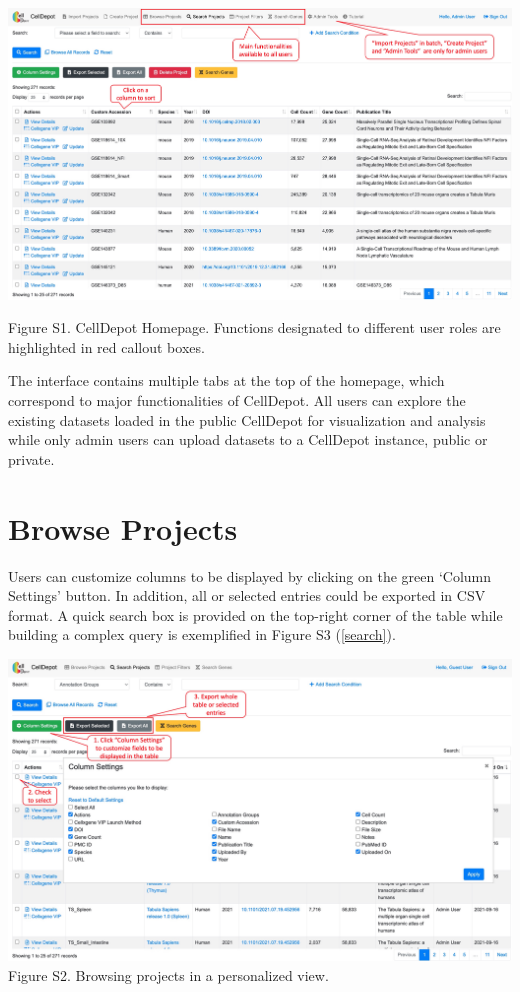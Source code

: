 \documentclass[
  openany]{book}
\begin{document}
\href{https://interactivereport.github.io/CellDepot/bookdown/figures/S1.jpg}{\includegraphics{figures/S1.jpg}}

Figure S1. CellDepot Homepage. Functions designated to different user roles are highlighted in red callout boxes.

The interface contains multiple tabs at the top of the homepage, which correspond to major functionalities of CellDepot. All users can explore the existing datasets loaded in the public CellDepot for visualization and analysis while only admin users can upload datasets to a CellDepot instance, public or private.

\hypertarget{browse-projects}{%
\section{Browse Projects}\label{browse-projects}}

Users can customize columns to be displayed by clicking on the green `Column Settings' button. In addition, all or selected entries could be exported in CSV format. A quick search box is provided on the top-right corner of the table while building a complex query is exemplified in Figure S3 (\ref{search}).

\href{https://interactivereport.github.io/CellDepot/bookdown/figures/S2.jpg}{\includegraphics{figures/S2.jpg}}
Figure S2. Browsing projects in a personalized view.
\end{document}
